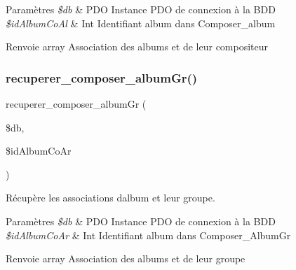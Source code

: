 \begin{DoxyParams}{Paramètres}
{\em \$db} & P\+DO Instance P\+DO de connexion à la B\+DD \\
\hline
{\em \$id\+Album\+Co\+Al} & Int Identifiant album dans Composer\+\_\+album \\
\hline
\end{DoxyParams}
\begin{DoxyReturn}{Renvoie}
array Association des albums et de leur compositeur 
\end{DoxyReturn}
\mbox{\label{fonctionAlbum_8php_aadff6d61fc94c40b1db762393db06bb7}} 
\subsubsection{\texorpdfstring{recuperer\+\_\+composer\+\_\+album\+Gr()}{recuperer\_composer\_albumGr()}}
{\footnotesize\ttfamily recuperer\+\_\+composer\+\_\+album\+Gr (\begin{DoxyParamCaption}\item[{}]{\$db,  }\item[{}]{\$id\+Album\+Co\+Ar }\end{DoxyParamCaption})}



Récupère les associations d\textquotesingle{}album et leur groupe. 


\begin{DoxyParams}{Paramètres}
{\em \$db} & P\+DO Instance P\+DO de connexion à la B\+DD \\
\hline
{\em \$id\+Album\+Co\+Ar} & Int Identifiant album dans Composer\+\_\+\+Album\+Gr \\
\hline
\end{DoxyParams}
\begin{DoxyReturn}{Renvoie}
array Association des albums et de leur groupe 
\end{DoxyReturn}
\mbox{\label{fonctionAlbum_8php_a5d2684de0038530d8d534467326fbac1}} 

